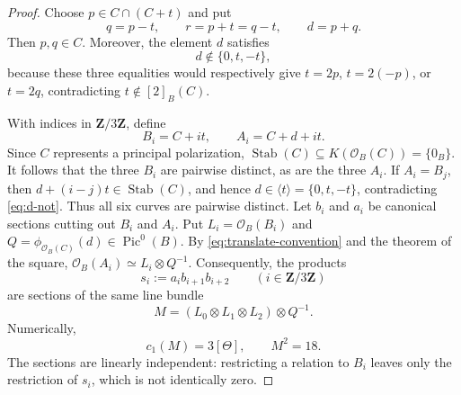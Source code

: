 \documentclass[12pt]{amsart}
\numberwithin{equation}{section}
\theoremstyle{definition}
\theoremstyle{remark}
\newcommand{\Z}{\mathbf Z}
\newcommand{\cO}{\mathcal O}
\newcommand{\Pic}{\operatorname{Pic}}
\begin{document}
\begin{proof}
Choose $p\in C\cap(C+t)$ and put
\[
  q=p-t,\qquad r=p+t=q-t,\qquad d=p+q.
\]
Then $p,q\in C$.  Moreover, the element $d$ satisfies
\begin{equation}
  d\notin\{0,t,-t\},
\label{eq:d-not}
\end{equation}
because these three equalities would respectively give
$t=2p$, $t=2(-p)$, or $t=2q$, contradicting
$t\notin[2]_B(C)$.

With indices in $\Z/3\Z$, define
\[
  B_i=C+it,\qquad A_i=C+d+it.
\]
Since $C$ represents a principal polarization,
$\operatorname{Stab}(C)\subseteq K(\cO_B(C))=\{0_B\}$.
It follows that the three $B_i$ are pairwise distinct, as are the three
$A_i$.  If $A_i=B_j$, then
$d+(i-j)t\in\operatorname{Stab}(C)$, and hence
$d\in\langle t\rangle=\{0,t,-t\}$, contradicting
\eqref{eq:d-not}.  Thus all six curves are pairwise distinct.
Let $b_i$ and $a_i$ be canonical sections cutting out $B_i$ and $A_i$.
Put $L_i=\cO_B(B_i)$ and
$Q=\phi_{\cO_B(C)}(d)\in\Pic^0(B)$.  By
\eqref{eq:translate-convention} and the theorem of the square,
$\cO_B(A_i)\simeq L_i\otimes Q^{-1}$.
Consequently, the products
\[
  s_i:=a_i b_{i+1}b_{i+2}\qquad(i\in\Z/3\Z)
\]
are sections of the same line bundle
\[
  M=(L_0\otimes L_1\otimes L_2)\otimes Q^{-1}.
\]
Numerically,
\[
  c_1(M)=3[\Theta],\qquad M^2=18.
\]
The sections are linearly independent: restricting a relation to $B_i$
leaves only the restriction of $s_i$, which is not identically zero.


\end{proof}
\end{document}
